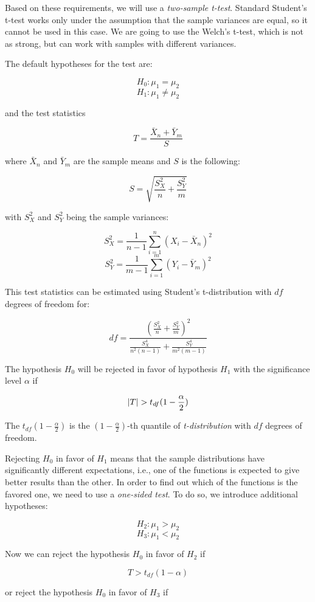 Based on these requirements, we will use a \textit{two-sample t-test}. Standard Student's t-test works only under the assumption that the sample variances are equal, so it cannot be used in this case. We are going to use the Welch's t-test, which is not as strong, but can work with samples with different variances.

The default hypotheses for the test are:

\[
H_0: \mu_1 = \mu_2
\]
\[
H_1: \mu_1 \ne  \mu_2
\]

and the test statistics

\[
T = \frac{\bar{X}_n + \bar{Y}_m}{S}
\]

where $\bar{X}_n$ and $\bar{Y}_m$ are the sample means and $S$ is the following:

\[
S = \sqrt{\frac{S_X^2}{n} + \frac{S_Y^2}{m}}
\]

with $S_X^2$ and $S_Y^2$ being the sample variances:

\[
S_X^2 = \frac{1}{n-1} \sum_{i=1}^{n}(X_i - \bar{X}_n)^2
\]
\[
S_Y^2 = \frac{1}{m-1} \sum_{i=1}^{m}(Y_i - \bar{Y}_m)^2
\]

This test statistics can be estimated using Student's t-distribution with $df$ degrees of freedom for:

\[
df = \frac{(\frac{S_X^2}{n} + \frac{S_Y^2}{m})^2}{\frac{S_X^4}{n^2(n - 1)} + \frac{S_Y^4}{m^2(m - 1)}}
\]

The hypothesis $H_0$ will be rejected in favor of hypothesis $H_1$ with the significance level $\alpha$ if

\[\left|{T}\right| > t_{df}(1-\frac{\alpha}{2})\]

The $t_{df}(1-\frac{\alpha}{2})$ is the $(1-\frac{\alpha}{2})$-th quantile of \textit{t-distribution} with $df$ degrees of freedom.

Rejecting $H_0$ in favor of $H_1$ means that the sample distributions have significantly different expectations, i.e., one of the functions is expected to give better results than the other. In order to find out which of the functions is the favored one, we need to use a \textit{one-sided test}. To do so, we introduce additional hypotheses:

\[
H_2: \mu_1 > \mu_2
\]
\[
H_3: \mu_1 < \mu_2
\]

Now we can reject the hypothesis $H_0$ in favor of $H_2$ if

\[T > t_{df}(1-\alpha)\]

or reject the hypothesis $H_0$ in favor of $H_3$ if

